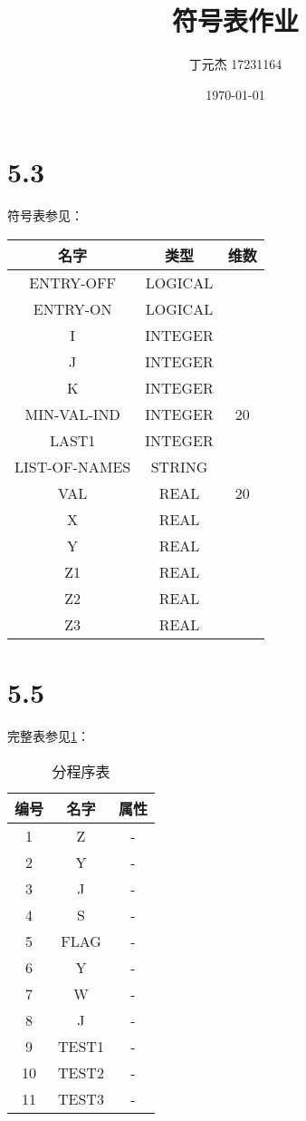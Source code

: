 \documentclass[UTF8]{ctexart}
\title{符号表作业}
\author{丁元杰 17231164}
\date{\today}
\begin{document}
\maketitle

\section*{5.3}
符号表参见：
\begin{table}[htbp!]
    \centering
    \begin{tabular}{|c|c|c|}
        \hline
        名字&类型&维数\\
        \hline
        ENTRY-OFF&LOGICAL&\\
        ENTRY-ON&LOGICAL&\\
        I&INTEGER&\\
        J&INTEGER&\\
        K&INTEGER&\\
        MIN-VAL-IND&INTEGER&20\\
        LAST1&INTEGER&\\
        LIST-OF-NAMES&STRING&\\
        VAL&REAL&20\\
        X&REAL&\\
        Y&REAL&\\
        Z1&REAL&\\
        Z2&REAL&\\
        Z3&REAL&\\
        \hline
        
    
    \end{tabular}
    
\end{table}

\section*{5.5}
完整表参见\ref{1}：
\begin{table}[htbp!]
    \centering
    \begin{tabular}{|c|c|c|}
        \hline
        编号&名字&属性\\
        \hline
        1&Z&-\\
        2&Y&-\\
        3&J&-\\
        4&S&-\\
        5&FLAG&-\\
        6&Y&-\\
        7&W&-\\
        8&J&-\\
        9&TEST1&-\\
        10&TEST2&-\\
        11&TEST3&-\\
        \hline
        
    \end{tabular}
    \caption{分程序表}
    \label{1}
\end{table}
\end{document}
